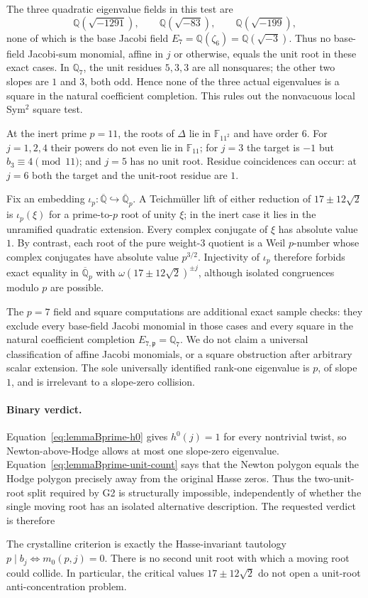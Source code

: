 The three quadratic eigenvalue fields in this test are
\[
 \mathbb Q(\sqrt{-1291}),\qquad
 \mathbb Q(\sqrt{-83}),\qquad
 \mathbb Q(\sqrt{-199}),
\]
none of which is the base Jacobi field
$E_7=\mathbb Q(\zeta_6)=\mathbb Q(\sqrt{-3})$.  Thus no base-field
Jacobi-sum monomial, affine in $j$ or otherwise, equals the unit root in
these exact cases.  In $\mathbb Q_7$, the unit residues $5,3,3$ are all
nonsquares; the other two slopes are $1$ and $3$, both odd.  Hence none of
the three actual eigenvalues is a square in the natural coefficient
completion.  This rules out the nonvacuous local Sym$^2$ square test.

At the inert prime $p=11$, the roots of $\Delta$ lie in
$\mathbb F_{11^2}$ and have order $6$.  For $j=1,2,4$ their powers do not
even lie in $\mathbb F_{11}$; for $j=3$ the target is $-1$ but
$b_3\equiv4\pmod {11}$; and $j=5$ has no unit root.  Residue coincidences
can occur: at $j=6$ both the target and the unit-root residue are $1$.

Fix an embedding
$\iota_p:\overline{\mathbb Q}\hookrightarrow\overline{\mathbb Q}_p$.
A Teichm\"uller lift of either reduction of $17\pm12\sqrt2$ is
$\iota_p(\xi)$ for a prime-to-$p$ root of unity $\xi$; in the inert case it
lies in the unramified quadratic extension.  Every complex conjugate of
$\xi$ has absolute value $1$.  By contrast, each root of the pure
weight-$3$ quotient is a Weil $p$-number whose complex conjugates have
absolute value $p^{3/2}$.  Injectivity of $\iota_p$ therefore forbids exact
equality in $\overline{\mathbb Q}_p$ with
$\omega(17\pm12\sqrt2)^{\pm j}$, although isolated congruences modulo $p$
are possible.

The $p=7$ field and square computations are additional exact sample checks:
they exclude every base-field Jacobi monomial in those cases and every
square in the natural coefficient completion
$E_{7,\mathfrak p}=\mathbb Q_7$.  We do not claim a universal classification
of affine Jacobi monomials, or a square obstruction after arbitrary scalar
extension.  The sole universally identified rank-one eigenvalue is $p$, of
slope $1$, and is irrelevant to a slope-zero collision.

\paragraph{Binary verdict.}
Equation~\eqref{eq:lemmaBprime-h0} gives $h^0(j)=1$ for every nontrivial
twist, so Newton-above-Hodge allows at most one slope-zero eigenvalue.
Equation~\eqref{eq:lemmaBprime-unit-count} says that the Newton polygon
equals the Hodge polygon precisely away from the original Hasse zeros.
Thus the two-unit-root split required by G2 is structurally impossible,
independently of whether the single moving root has an isolated alternative
description.  The requested verdict is therefore
\begin{center}
\end{center}
The crystalline criterion is exactly the Hasse-invariant tautology
$p\mid b_j\Longleftrightarrow m_0(p,j)=0$.  There is no second unit root
with which a moving root could collide.  In particular,
the critical values $17\pm12\sqrt2$ do not open a unit-root
anti-concentration problem.

